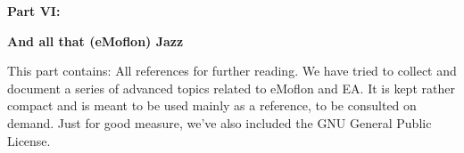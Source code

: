 \vspace*{2cm}

{\bf \huge Part VI:}
\vspace{1cm}

{\Huge \bf And all that (eMoflon) Jazz}
\vspace{1cm}

\genHeader

This part contains: All references for further reading. We have tried to collect and document a series of advanced topics related to eMoflon and EA. It is kept
rather compact and is meant to be used mainly as a reference, to be consulted on demand. Just for good measure, we've also included the GNU General Public
License.
















